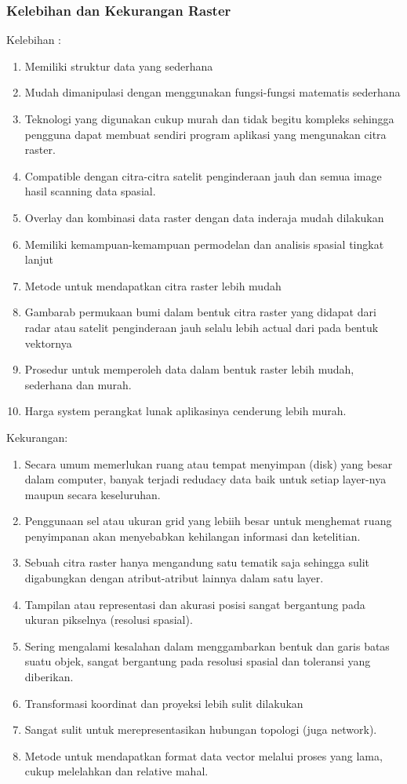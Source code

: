 \subsubsection{Kelebihan dan Kekurangan Raster}
 Kelebihan :
 \begin{enumerate}
    \item Memiliki struktur data yang sederhana
    \item Mudah dimanipulasi dengan menggunakan fungsi-fungsi matematis sederhana
    \item Teknologi yang digunakan cukup murah dan tidak begitu kompleks sehingga pengguna dapat 
             membuat sendiri program aplikasi yang mengunakan citra raster.
    \item Compatible dengan citra-citra satelit penginderaan jauh dan semua image hasil scanning data spasial.
    \item Overlay dan kombinasi data raster dengan data inderaja mudah dilakukan
    \item Memiliki kemampuan-kemampuan permodelan dan analisis spasial tingkat lanjut
    \item Metode untuk mendapatkan citra raster lebih mudah
    \item Gambarab permukaan bumi dalam bentuk citra raster yang didapat dari radar atau satelit 
             penginderaan jauh selalu lebih actual dari pada bentuk vektornya
    \item Prosedur untuk memperoleh data dalam bentuk raster lebih mudah, sederhana dan murah.
    \item Harga system perangkat lunak aplikasinya cenderung lebih murah.
 \end{enumerate}
 Kekurangan:
 \begin{enumerate}
    \item Secara umum memerlukan ruang atau tempat menyimpan (disk) yang besar dalam computer, 
             banyak terjadi redudacy data baik untuk setiap layer-nya maupun secara keseluruhan.
    \item Penggunaan sel atau ukuran grid yang lebiih besar untuk menghemat ruang penyimpanan akan 
             menyebabkan kehilangan informasi dan ketelitian.
    \item Sebuah citra raster hanya mengandung satu tematik saja sehingga sulit digabungkan 
             dengan atribut-atribut lainnya dalam satu layer.
    \item Tampilan atau representasi dan akurasi posisi sangat bergantung pada ukuran pikselnya (resolusi spasial).
    \item Sering mengalami kesalahan dalam menggambarkan bentuk dan garis batas suatu objek, 
             sangat bergantung pada resolusi spasial dan toleransi yang diberikan.
    \item Transformasi koordinat dan proyeksi lebih sulit dilakukan
    \item Sangat sulit untuk merepresentasikan hubungan topologi (juga network).
    \item Metode untuk mendapatkan format data vector melalui proses yang lama, cukup melelahkan dan relative mahal.
  \end{enumerate}
